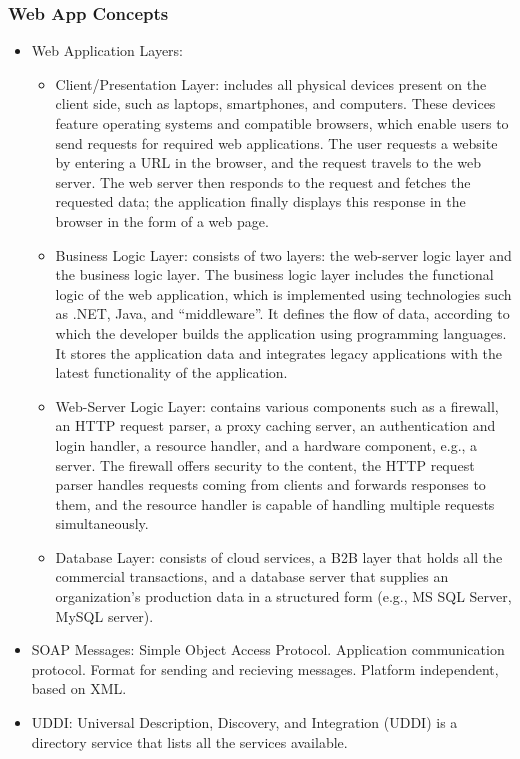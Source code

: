 \subsubsection{Web App Concepts}
\begin{itemize}
    \item Web Application Layers:
    \begin{itemize}
        \item Client/Presentation Layer: includes all physical devices present on the client side, such as laptops, smartphones, and computers. These devices feature operating systems and compatible browsers, which enable users to send requests for required web applications. The user requests a website by entering a URL in the browser, and the request travels to the web server. The web server then responds to the request and fetches the requested data; the application finally displays this response in the browser in the form of a web page.
        \item Business Logic Layer: consists of two layers: the web-server logic layer and the business logic layer. The business logic layer includes the functional logic of the web application, which is implemented using technologies such as .NET, Java, and “middleware”. It defines the flow of data, according to which the developer builds the application using programming languages. It stores the application data and integrates legacy applications with the latest functionality of the application.
        \item Web-Server Logic Layer: contains various components such as a firewall, an HTTP request parser, a proxy caching server, an authentication and login handler, a resource handler, and a hardware component, e.g., a server. The firewall offers security to the content, the HTTP request parser handles requests coming from clients and forwards responses to them, and the resource handler is capable of handling multiple requests simultaneously.
        \item Database Layer: consists of cloud services, a B2B layer that holds all the commercial transactions, and a database server that supplies an organization's production data in a structured form (e.g., MS SQL Server, MySQL server).
    \end{itemize}
    \item SOAP Messages: Simple Object Access Protocol. Application communication protocol. Format for sending and recieving messages. Platform independent, based on XML.
    \item UDDI: Universal Description, Discovery, and Integration (UDDI) is a directory service that lists all the services available.

\end{itemize}
